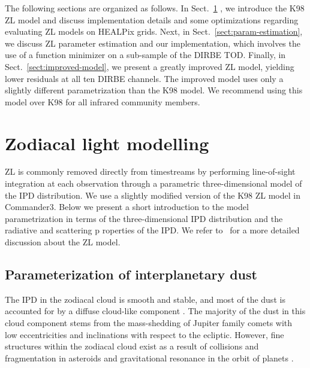 \documentclass{aa}
\begin{document}
The following sections are organized as follows. In Sect.~\ref{sect:zodi-model}
, we introduce the K98 ZL model and discuss 
implementation details and some optimizations regarding evaluating ZL 
models on HEALPix grids. Next, in Sect.~\ref{sect:param-estimation}, we 
discuss ZL parameter estimation and our implementation, which involves 
the use of a function minimizer on a sub-sample of the DIRBE TOD. 
Finally, in Sect.~\ref{sect:improved-model}, we present a greatly 
improved ZL model, yielding lower residuals at all ten DIRBE channels. 
The improved model uses only a slightly different parametrization than 
the K98 model. We recommend using this model over K98 for all infrared 
community members.


\section{Zodiacal light modelling}\label{sect:zodi-model}
ZL is commonly removed directly from timestreams by performing 
line-of-sight integration at each observation through a parametric 
three-dimensional model of the IPD distribution. We use a slightly 
modified version of the K98 ZL model in Commander3. Below we present a 
short introduction to the model parametrization in terms of the 
three-dimensional IPD distribution and the radiative and scattering p
roperties of the IPD. We refer to~\cite{Kelsall1998} for a more detailed 
discussion about the ZL model.


\subsection{Parameterization of interplanetary dust}
The IPD in the zodiacal cloud is smooth and stable, and most of the dust 
is accounted for by a diffuse cloud-like component \citep{Leinert1998}. 
The majority of the dust in this cloud component stems from the 
mass-shedding of Jupiter family comets with low eccentricities and 
inclinations with respect to the ecliptic. However, fine structures 
within the zodiacal cloud exist as a result of collisions and 
fragmentation in asteroids and gravitational resonance in the orbit of 
planets \citep{Low1984, Dermott1984, Dermott1994, Reach1997}. 
\end{document}
